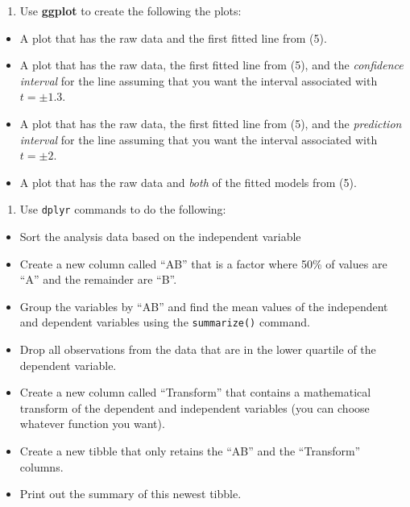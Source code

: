 \documentclass[
]{article}
\providecommand{\tightlist}{%
  \setlength{\itemsep}{0pt}\setlength{\parskip}{0pt}}
\begin{document}
\begin{enumerate}
\def\labelenumi{\arabic{enumi}.}
\setcounter{enumi}{5}
\tightlist
\item
  Use \textbf{ggplot} to create the following the plots:
\end{enumerate}

\begin{itemize}
\tightlist
\item
  A plot that has the raw data and the first fitted line from (5).
\item
  A plot that has the raw data, the first fitted line from (5), and the
  \emph{confidence interval} for the line assuming that you want the
  interval associated with \(t =\pm 1.3\).
\item
  A plot that has the raw data, the first fitted line from (5), and the
  \emph{prediction interval} for the line assuming that you want the
  interval associated with \(t =\pm 2\).
\item
  A plot that has the raw data and \emph{both} of the fitted models from
  (5).
\end{itemize}

\begin{enumerate}
\def\labelenumi{\arabic{enumi}.}
\setcounter{enumi}{6}
\tightlist
\item
  Use \texttt{dplyr} commands to do the following:
\end{enumerate}

\begin{itemize}
\tightlist
\item
  Sort the analysis data based on the independent variable
\item
  Create a new column called ``AB'' that is a factor where 50\% of
  values are ``A'' and the remainder are ``B''.
\item
  Group the variables by ``AB'' and find the mean values of the
  independent and dependent variables using the \texttt{summarize()}
  command.
\item
  Drop all observations from the data that are in the lower quartile of
  the dependent variable.
\item
  Create a new column called ``Transform'' that contains a mathematical
  transform of the dependent and independent variables (you can choose
  whatever function you want).
\item
  Create a new tibble that only retains the ``AB'' and the ``Transform''
  columns.
\item
  Print out the summary of this newest tibble.
\end{itemize}
\end{document}

